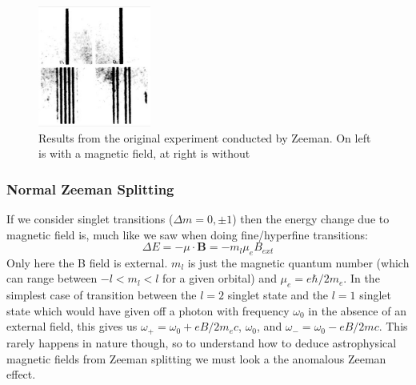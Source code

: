 \documentclass{article}
\begin{document}
 \begin{figure}[ht]
     \centering
     \includegraphics[width=0.33\textwidth]{figures/zeeman1.png}
     \caption{Results from the original experiment conducted by Zeeman. On left is with a magnetic field, at right is without}
     \label{fig:zeeman_exp}
 \end{figure}
 
 \subsubsection{Normal Zeeman Splitting}
 If we consider singlet transitions ($\Delta m = 0, \pm 1$) then the energy change due to magnetic field is, much like we saw when doing fine/hyperfine transitions:
\begin{equation} 
\Delta E = -\mu \cdot \mathbf{B} = - m_l \mu_e B_{ext}
\end{equation}
Only here the B field is external. $m_l$ is just the magnetic quantum number (which can range between $-l < m_l < l$ for a given orbital) and $\mu_e = e\hbar/2m_e$. In the simplest case of transition between the $l = 2$ singlet state and the $l = 1$ singlet state which would have given off a photon with frequency $\omega_0$ in the absence of an external field, this gives us $\omega_+ = \omega_0 + eB/2m_e c$, $\omega_0$, and $\omega_- =  \omega_0 - eB/2mc$. This rarely happens in nature though, so to understand how to deduce astrophysical magnetic fields from Zeeman splitting we must look a the anomalous Zeeman effect.
\end{document}
